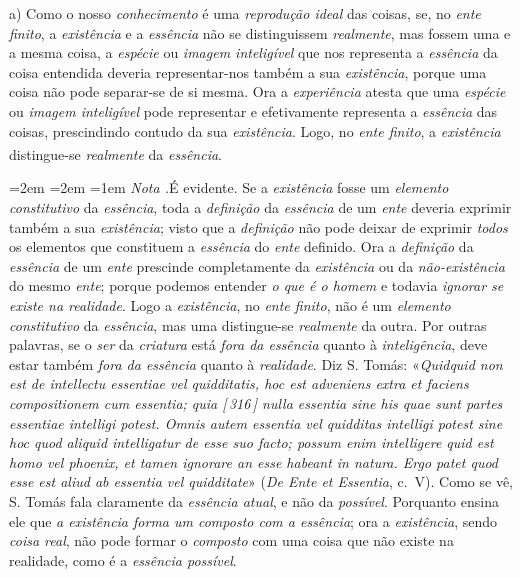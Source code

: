 \documentclass[12pt,a4paper]{article}
\newcommand{\pg}[1]{\thinspace\textup{[\,#1\,]}\thinspace}
\newcommand{\subp}[1]{\medskip\noindent#1)\quad}
\renewcommand\footnote[1]{%
    \stepcounter{footnote}\textsuperscript{\thefootnote}%
    \par
    {\footnotesize
     \leftskip=2em \rightskip=2em \parindent=1em
     \addvspace{\medskipamount}%
     \noindent\textit{Nota \thefootnote.}\enspace #1\par
     \addvspace{\medskipamount}}%
  }
\begin{document}
\subp{a} Como o nosso \emph{conhecimento} é uma \emph{reprodução ideal} das
coisas, se, no \emph{ente finito}, a \emph{existência} e a \emph{essência} não
se distinguissem \emph{realmente}, mas fossem uma e a mesma coisa, a
\emph{espécie} ou \emph{imagem inteligível} que nos representa a \emph{essência}
da coisa entendida deveria representar-nos também a sua \emph{existência},
porque uma coisa não pode separar-se de si mesma. Ora a \emph{experiência}
atesta que uma \emph{espécie} ou \emph{imagem inteligível} pode representar e
efetivamente representa a \emph{essência} das coisas, prescindindo contudo da
sua \emph{existência}. Logo, no \emph{ente finito}, a \emph{existência}
distingue-se \emph{realmente} da \emph{essência}.\footnote{É evidente. Se a
\emph{existência} fosse um \emph{elemento constitutivo} da \emph{essência}, toda
a \emph{definição} da \emph{essência} de um \emph{ente} deveria exprimir também
a sua \emph{existência}; visto que a \emph{definição} não pode deixar de
exprimir \emph{todos} os elementos que constituem a \emph{essência} do
\emph{ente} definido. Ora a \emph{definição} da \emph{essência} de um \emph{ente}
prescinde completamente da \emph{existência} ou da \emph{não-existência} do
mesmo \emph{ente}; porque podemos entender \emph{o que é o homem} e todavia
\emph{ignorar se existe na realidade}. Logo a \emph{existência}, no \emph{ente
finito}, não é um \emph{elemento constitutivo} da \emph{essência}, mas uma
distingue-se \emph{realmente} da outra. \textemdash{} Por outras palavras, se o
\emph{ser} da \emph{criatura} está \emph{fora da essência} quanto à
\emph{inteligência}, deve estar também \emph{fora da essência} quanto à
\emph{realidade}. \textemdash{} Diz S. Tomás: «\textit{Quidquid non est de
intellectu essentiae vel quidditatis, hoc est adveniens extra et faciens
compositionem cum essentia; quia \pg{316} nulla essentia sine his quae sunt
partes essentiae intelligi potest. Omnis autem essentia vel quidditas intelligi
potest sine hoc quod aliquid intelligatur de esse suo facto; possum enim
intelligere quid est homo vel phoenix, et tamen ignorare an esse habeant in
natura. Ergo patet quod esse est aliud ab essentia vel quidditate}» (\emph{De
Ente et Essentia}, c.~V). \textemdash{} Como se vê, S. Tomás fala claramente da
\emph{essência atual}, e não da \emph{possível}. Porquanto ensina ele que \emph{a
existência forma um composto com a essência}; ora a \emph{existência}, sendo
\emph{coisa real}, não pode formar o \emph{composto} com uma coisa que não
existe na realidade, como é a \emph{essência possível}.}
\end{document}
